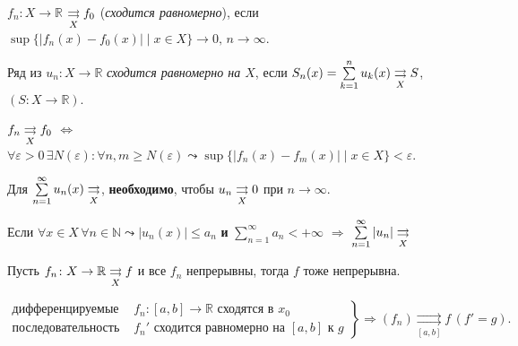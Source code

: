
\begin{to_def}
	$f_n \colon X \to \mathbb{R}$ $\underset{X}{\rightrightarrows} f_0$ (\textit{сходится равномерно}), если $\sup\{|f_n(x) - f_0(x)| \mid x \in X\} \to 0, \, n \to \infty$.
\end{to_def}

\begin{to_def}
	Ряд из $u_n \colon X \to \mathbb{R}$ \textit{сходится равномерно на $X$}, если $S_n(x) = \sum\limits_{ k=1 }^{ n } u_k(x) \underset{X}{\rightrightarrows} S$, $(S \colon X \to \mathbb{R})$.
\end{to_def}

\begin{to_thr}
	$f_n \underset{X}{\rightrightarrows} f_0$ $\Leftrightarrow$ $\forall \varepsilon > 0 \, \exists N(\varepsilon) \colon \forall n,m \geq N(\varepsilon) \leadsto \sup\{|f_n(x) - f_m(x)| \mid x \in X\} < \varepsilon$.

	\label{4.36}
\end{to_thr}

\begin{to_con}
	Для $\sum\limits_{ n = 1 }^{ \infty } u_n(x) \underset{X}{\rightrightarrows}$, \textbf{необходимо}, чтобы $u_n \underset{X}{\rightrightarrows} 0$ при $n \to \infty$.	
\end{to_con}

\begin{to_thr}
	Если $\forall x \in X\, \forall n \in \mathbb{N} \leadsto |u_n(x)| \leq a_n$ \textbf{и} $\sum\limits_{ n = 1 }^{ \infty } a_n < +\infty$ $\Rightarrow$ $\sum\limits_{ n = 1 }^{ \infty } |u_n| \underset{X}{\rightrightarrows}$ 
	\label{4.39}
\end{to_thr}

\begin{to_thr}
	Пусть $f_n \colon X \to \mathbb{R} \underset{X}{\rightrightarrows} f$ и все $f_n$ непрерывны, тогда $f$ тоже непрерывна.
	\label{4.40}	
\end{to_thr}

\begin{to_thr}
	\begin{equation*}
		\left.
		\begin{aligned}
		    \text{дифференцируемые } &f_n \colon [a,b] \to \mathbb{R} \text{ сходятся в }x_0\\
		    \text{последовательность }&f_n' \text{ сходится равномерно на }[a,b] \text{ к } g
		\end{aligned}
		\right\}
		\Longrightarrow
		(f_n) \underset{[a,b]}{\rightrightarrows} f\, (f' = g).
	\end{equation*}
	\label{4.41}
\end{to_thr}

